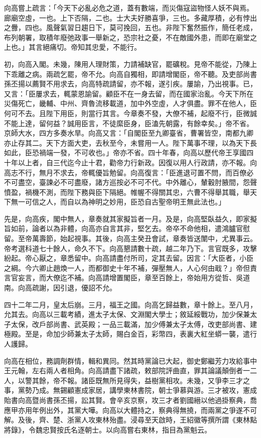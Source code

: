 \begin{pinyinscope}
向高嘗上疏言：「今天下必亂必危之道，蓋有數端，而災傷寇盜物怪人妖不與焉。廊廟空虛，一也。上下否隔，二也。士大夫好勝喜爭，三也。多藏厚積，必有悖出之釁，四也。風聲氣習日趨日下，莫可挽回，五也。非陛下奮然振作，簡任老成，布列朝署，取積年廢弛政事一舉新之，恐宗社之憂，不在敵國外患，而即在廟堂之上也。」其言絕痛切。帝知其忠愛，不能行。

初，向高入閣。未幾，陳用人理財策，力請補缺官，罷礦稅。見帝不能從，乃陳上下乖離之病。兩疏乞罷，帝不允。向高自獨相，即請增閣臣，帝不聽。及吏部尚書孫丕揚以薦賢不用求去，向高特疏請留，亦不報，遂引疾。屢諭，乃出視事。已，又言：「臣屢求去，輒蒙恩諭留。顧臣不在一身去留，而在國家治亂。今天下所在災傷死亡，畿輔、中州、齊魯流移載道，加中外空虛，人才俱盡。罪不在他人，臣何可不去。且陛下用臣，則當行其言。今章奏不發，大僚不補，起廢不行，臣微誠不能上達，留何益？誠用臣言，不徒縻臣身，臣溘先朝露，有餘幸矣。」帝不省。京師大水，四方多奏水旱。向高又言：「自閣臣至九卿臺省，曹署皆空，南都九卿亦止存其二。天下方面大吏，去秋至今，未嘗用一人。陛下萬事不理，以為天下長如此，臣恐禍端一發，不可收也。」帝亦不省。四十年春，向高以歷代帝王享國四十年以上者，自三代迄今止十君，勸帝力行新政。因復以用人行政請，亦不報。向高志不行，無月不求去，帝輒優旨勉留。向高復言：「臣進退可置不問，而百僚必不可盡空，臺諫必不可盡廢，諸方巡按必不可不代。中外離心，輦轂肘腋間，怨聲憤盈，禍機不測，而陛下務與臣下隔絕。帷幄不得關其忠，六曹不得舉其職，舉天下無一可信之人，而自以為神明之妙用，臣恐自古聖帝明王無此法也。」

先是，向高疾，閣中無人，章奏就其家擬旨者一月。及是，向高堅臥益久，即家擬旨如前，論者以為非體，向高亦自言其非，堅乞去。帝卒不命他相，遣鴻臚官慰留。至帝萬壽節，始起視事。其後，向高主癸丑會試，章奏皆送闈中，尤異事云。帝考選科道七十餘人，命久不下。向高懇請數十疏，越二年乃下。言官既多，攻擊紛起。帝心厭之，章悉留中。向高請盡付所司，定其去留。因言：「大臣者，小臣之綱。今六卿止趙煥一人，而都御史十年不補，彈壓無人，人心何由戢？」帝但責言官妄言，而大僚迄不補。向高請增置閣臣，章至百餘上，帝始用方從哲、吳道南。向高疏謝，因引退，優詔不允。

四十二年二月，皇太后崩。三月，福王之國。向高乞歸益數，章十餘上。至八月，允其去。向高以三載考績，進太子太保、文淵閣大學士；敘延綏戰功，加少保兼太子太保，改戶部尚書、武英殿；一品三載滿，加少傅兼太子太傅，改吏部尚書、建極殿。至是，命加少師兼太子太師，賜白金百，彩幣四，表裏大紅坐蟒一襲，遣行人護歸。

向高在相位，務調劑群情，輯和異同。然其時黨論已大起，御史鄭繼芳力攻給事中王元翰，左右兩人者相角。向高請盡下諸疏，敕部院評曲直，罪其論議顛倒者一二人，以警其餘，帝不報。諸臣既無所見得失，益樹黨相攻。未幾，又爭李三才之事，黨勢乃成。無錫顧憲成家居，講學東林書院，朝士爭慕與游。三才被攻，憲成貽書向高暨尚書孫丕揚，訟其賢。會辛亥京察，攻三才者劉國縉以他過掛察典，喬應甲亦用年例出外，其黨大嘩。向高以大體持之，察典得無撓，而兩黨之爭遂不可解。及後，齊、楚、浙黨人攻東林殆盡。浸尋至天啟時，王紹徽等撰所謂《東林點將錄》，令魏忠賢按氏名逐朝士。以向高嘗右東林，指目為黨魁云。


\end{pinyinscope}
